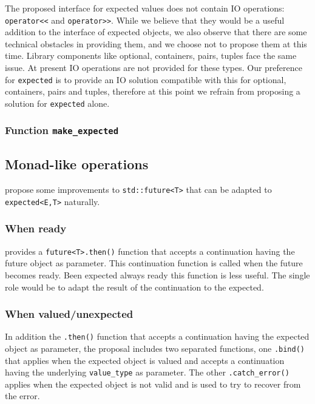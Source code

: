 \documentclass[a4paper,10pt]{article}
\newcommand{\cpp}[1]{\lstinline{#1}}
\begin{document}
The proposed interface for expected values does not contain IO operations: \cpp{operator<<} and \cpp{operator>>}. While we believe that they would be a useful addition to the interface of expected objects, we also observe that there are some technical obstacles in providing them, and we choose not to propose them at this time. Library components like optional, containers, pairs, tuples face the same issue. At present IO operations are not provided for these types. Our preference for \cpp{expected} is to provide an IO solution compatible with this for optional, containers, pairs and tuples, therefore at this point we refrain from proposing a solution for \cpp{expected} alone.


\subsubsection{Function \cpp{make_expected}}

\subsection{Monad-like operations}

\cite{ImprovementsAsync} propose some improvements to \cpp{std::future<T>} that can be adapted to \cpp{expected<E,T>} naturally.

\subsubsection{When ready}

\cite{ImprovementsAsync} provides a \cpp{future<T>.then()} function that accepts a continuation having the future object as parameter. This continuation function is called when the future becomes ready. Been expected always ready this function is less useful. The single role would be to adapt the result of the continuation to the expected.

\subsubsection{When valued/unexpected}

In addition the \cpp{.then()} function that accepts a continuation having the expected object as parameter, the proposal includes two separated functions, one \cpp{.bind()} that applies when the expected object is valued and accepts a continuation having the underlying \cpp{value_type} as parameter. The other \cpp{.catch_error()} applies when the expected object is not valid and is used to try to recover from the error.  
\end{document}

